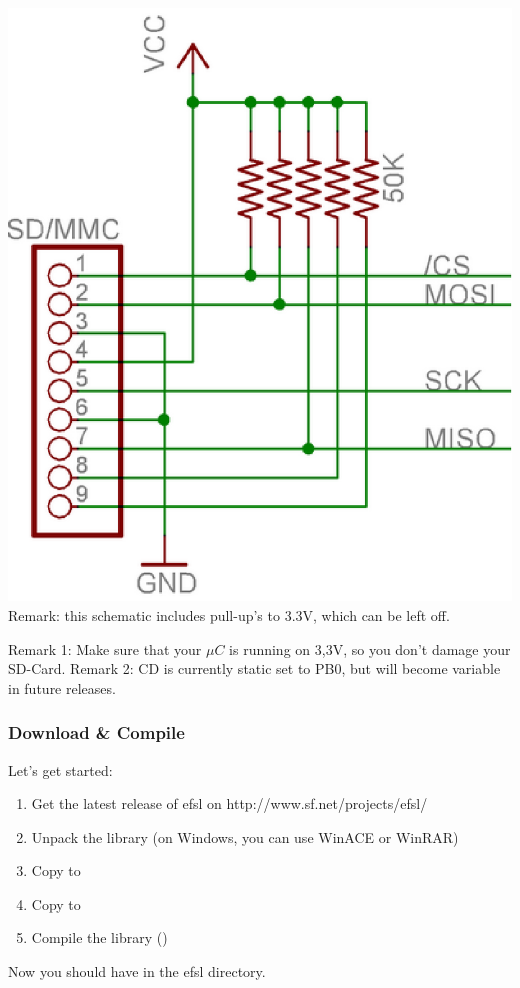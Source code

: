 \parbox[c]{.5\textwidth}{\begin{center}
	\includegraphics[width=.5\textwidth]{pics/sdconnection}
	\newline\newline
	Remark: this schematic includes pull-up's to 3.3V, which
	can be left off.
\end{center}}
\newline
Remark 1: Make sure that your $\mu C$ is running on 3,3V, so you don't
damage your SD-Card.\newline
\newline
Remark 2: CD is currently static set to PB0, but will become variable
in future releases.
\subsubsection{Download \& Compile}
Let's get started:
\begin{enumerate}
	\item{Get the latest release of efsl on http://www.sf.net/projects/efsl/}
	\item{Unpack the library (on Windows, you can use WinACE or WinRAR)}
	\item{Copy  to }
	\item{Copy  to }
	\item{Compile the library ()}
\end{enumerate}
Now you should have  in the efsl directory.

